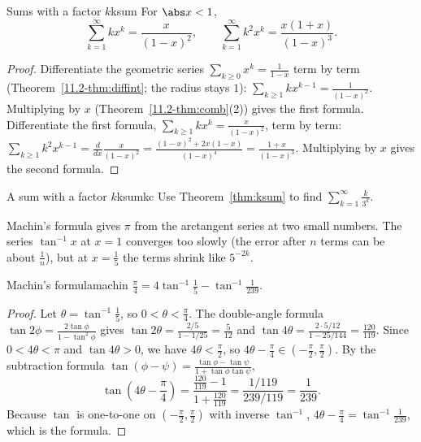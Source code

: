 \documentclass[11pt]{article}
\begin{document}
\begin{thm}{Sums with a factor $k$}{ksum}
For $\abs x<1$,
\[
\sum_{k=1}^\infty kx^k=\frac x{(1-x)^2},\qquad\sum_{k=1}^\infty k^2x^k=\frac{x(1+x)}{(1-x)^3}.
\]
\end{thm}
\begin{proof}
Differentiate the geometric series $\sum_{k\ge0}x^k=\frac1{1-x}$ term by term (Theorem~\ref{11.2-thm:diffint}; the radius stays $1$): $\sum_{k\ge1}kx^{k-1}=\frac1{(1-x)^2}$. Multiplying by $x$ (Theorem~\ref{11.2-thm:comb}(2)) gives the first formula. Differentiate the first formula, $\sum_{k\ge1}kx^k=\frac x{(1-x)^2}$, term by term: $\sum_{k\ge1}k^2x^{k-1}=\frac d{dx}\frac x{(1-x)^2}=\frac{(1-x)^2+2x(1-x)}{(1-x)^4}=\frac{1+x}{(1-x)^3}$. Multiplying by $x$ gives the second formula.
\end{proof}

\begin{kc}{A sum with a factor $k$}{ksumkc}
Use Theorem~\ref{thm:ksum} to find $\displaystyle\sum_{k=1}^\infty\frac k{3^k}$.
\end{kc}

Machin's formula gives $\pi$ from the arctangent series at two small numbers. The series $\tan^{-1}x$ at $x=1$ converges too slowly (the error after $n$ terms can be about $\frac1n$), but at $x=\frac15$ the terms shrink like $5^{-2k}$.

\begin{thm}{Machin's formula}{machin}
$\displaystyle\frac\pi4=4\tan^{-1}\frac15-\tan^{-1}\frac1{239}$.
\end{thm}
\begin{proof}
Let $\theta=\tan^{-1}\frac15$, so $0<\theta<\frac\pi4$. The double-angle formula $\tan2\phi=\frac{2\tan\phi}{1-\tan^2\phi}$ gives $\tan2\theta=\frac{2/5}{1-1/25}=\frac5{12}$ and $\tan4\theta=\frac{2\cdot5/12}{1-25/144}=\frac{120}{119}$. Since $0<4\theta<\pi$ and $\tan4\theta>0$, we have $4\theta<\frac\pi2$, so $4\theta-\frac\pi4\in\left(-\frac\pi2,\frac\pi2\right)$. By the subtraction formula $\tan(\phi-\psi)=\frac{\tan\phi-\tan\psi}{1+\tan\phi\tan\psi}$,
\[
\tan\left(4\theta-\frac\pi4\right)=\frac{\frac{120}{119}-1}{1+\frac{120}{119}}=\frac{1/119}{239/119}=\frac1{239}.
\]
Because $\tan$ is one-to-one on $\left(-\frac\pi2,\frac\pi2\right)$ with inverse $\tan^{-1}$, $4\theta-\frac\pi4=\tan^{-1}\frac1{239}$, which is the formula.
\end{proof}
\end{document}
